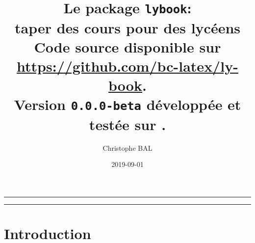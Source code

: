 \documentclass[12pt,a4paper]{scrartcl}
\begin{document}
\title{%
	Le package \texttt{lybook}:\\%
	taper des cours pour des lycéens\\%
	{\footnotesize Code source disponible sur \url{https://github.com/bc-latex/ly-book}.}\\%
{\footnotesize Version \texttt{0.0.0-beta} développée et testée sur \macosxname{}.}%
}
\author{Christophe BAL}
\date{2019-09-01}

\maketitle


\vspace{2em}

\hrule

\tableofcontents

\vspace{1.5em}

\hrule

\newpage



\section{Introduction}
\end{document}
